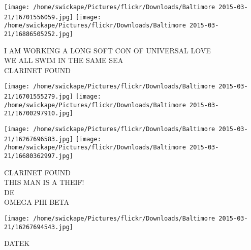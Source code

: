 \documentclass[10pt,letterpaper]{article}
\begin{document}
\vspace{0.25in}
\texttt{[image: /home/swickape/Pictures/flickr/Downloads/Baltimore 2015-03-21/16701556059.jpg]}
\texttt{[image: /home/swickape/Pictures/flickr/Downloads/Baltimore 2015-03-21/16886505252.jpg]}

I AM WORKING A LONG SOFT CON OF UNIVERSAL LOVE\\
WE ALL SWIM IN THE SAME SEA\\
CLARINET FOUND\\
\pagebreak

\texttt{[image: /home/swickape/Pictures/flickr/Downloads/Baltimore 2015-03-21/16701555279.jpg]}
\texttt{[image: /home/swickape/Pictures/flickr/Downloads/Baltimore 2015-03-21/16700297910.jpg]}

\texttt{[image: /home/swickape/Pictures/flickr/Downloads/Baltimore 2015-03-21/16267696583.jpg]}
\texttt{[image: /home/swickape/Pictures/flickr/Downloads/Baltimore 2015-03-21/16680362997.jpg]}

CLARINET FOUND\\
THIS MAN IS A THEIF!\\
DE\\
OMEGA PHI BETA\\
\pagebreak

\texttt{[image: /home/swickape/Pictures/flickr/Downloads/Baltimore 2015-03-21/16267694543.jpg]}

DATEK\\
\pagebreak
\end{document}
